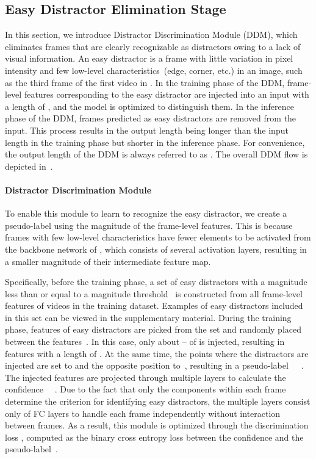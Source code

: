 \documentclass[10pt,twocolumn,letterpaper]{article}
\begin{document}
    \subsection{Easy Distractor Elimination Stage}
        In this section, we introduce Distractor Discrimination Module (DDM), which eliminates frames that are clearly recognizable as distractors owing to a lack of visual information. An easy distractor is a frame with little variation in pixel intensity and few low-level characteristics~(edge, corner, etc.) in an image, such as the third frame of the first video in . In the training phase of the DDM, frame-level features corresponding to the easy distractor are injected into an input with a length of , and the model is optimized to distinguish them. In the inference phase of the DDM, frames predicted as easy distractors are removed from the input. This process results in the output length being longer than the input length  in the training phase but shorter in the inference phase. For convenience, the output length of the DDM is always referred to as . The overall DDM flow is depicted in~.
        \vspace{-3mm}
        
        \paragraph{Distractor Discrimination Module \\}
            To enable this module to learn to recognize the easy distractor, we create a pseudo-label using the magnitude of the frame-level features. This is because frames with few low-level characteristics have fewer elements to be activated from the backbone network of , which consists of several activation layers, resulting in a smaller magnitude of their intermediate feature map. 
            
            Specifically, before the training phase, a set of easy distractors with a magnitude less than or equal to a magnitude threshold~ is constructed from all frame-level features of videos in the training dataset. Examples of easy distractors included in this set can be viewed in the supplementary material. During the training phase, features of easy distractors are picked from the set and randomly placed between the features~. In this case, only about – of  is injected, resulting in features with a length of . At the same time, the points where the distractors are injected are set to  and the opposite position to~, resulting in a pseudo-label~~~. The injected features are projected through multiple layers to calculate the confidence ~~. Due to the fact that only the components within each frame determine the criterion for identifying easy distractors, the multiple layers consist only of FC layers to handle each frame independently without interaction between frames. As a result, this module is optimized through the discrimination loss , computed as the binary cross entropy loss between the confidence  and the pseudo-label~. 
            
\end{document}

